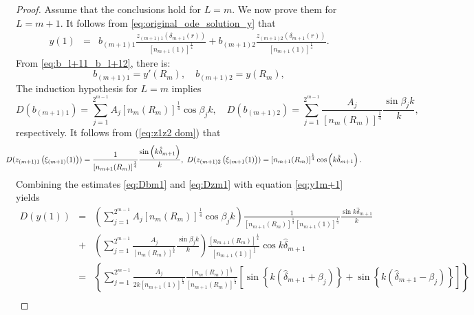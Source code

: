 \documentclass[11pt,reqno]{amsart}
\theoremstyle{definition}
\theoremstyle{remark}
\numberwithin{equation}{section}
\begin{document}
\begin{proof}
Assume that the conclusions hold for $L=m$. We now prove them for $L=m+1$.
It follows from \eqref{eq:original_ode_solution_y} that
\begin{eqnarray}\label{eq:y1m+1}
		y(1)&=&b_{(m+1)1}\frac{z_{(m+1)1}\left(\delta_{m+1}(r)\right)}{\left[n_{m+1}(1)\right]^{\frac{1}{4}}}+b_{(m+1)2}\frac{z_{(m+1)2}(\delta_{m+1}(r))}{\left[n_{m+1}(1)\right]^{\frac{1}{4}}}.
\end{eqnarray}
From \eqref{eq:b_l+11_b_l+12}, there is:
\begin{equation*}
	b_{(m+1)1}=y'(R_m), \quad b_{(m+1)2}=y(R_m), %
\end{equation*}
The induction hypothesis for $L=m$ implies
\begin{equation}\label{eq:Dbm1}
	D(b_{(m+1)1})=\sum_{j=1}^{2^{m-1}}A_j\left[n_m(R_m)\right]^{\frac{1}{4}}\cos{\beta_j k},\quad
	D(b_{(m+1)2})=\sum_{j=1}^{2^{m-1}}\frac{A_j}{\left[n_m(R_m)\right]^{\frac{1}{4}}}\frac{\sin{\beta_j k} }{k},
\end{equation}
respectively. It follows from (\ref{eq:z1z2 dom}) that
\begin{equation}\label{eq:Dzm1}
\hspace{-5mm}	D(z_{(m+1)1}\left(\xi_{(m+1)}(1)\right))=\frac{1}{\left[n_{m+1}(R_{m})\right]^{\frac{1}{4}}}\frac{\sin\left(k\hat{\delta}_{m+1}\right)}{k},~
	D(z_{(m+1)2}\left(\xi_{(m+1}(1)\right))=\left[n_{m+1}(R_{m})\right]^{\frac{1}{4}}\cos\left(k\hat{\delta}_{m+1}\right).
\end{equation}
Combining the estimates \eqref{eq:Dbm1} and \eqref{eq:Dzm1} with equation \eqref{eq:y1m+1} yields
\begin{eqnarray*}
D(y(1))&=&\left( \sum_{j=1}^{2^{m-1}}A_j\left[n_m(R_m)\right]^{\frac{1}{4}}\cos{\beta_j k} \right)\frac{1}{\left[n_{m+1}\left(R_m\right)\right]^{\frac{1}{4}}\left[n_{m+1}(1)\right]^{\frac{1}{4}}}\frac{\sin{k\hat{\delta}}_{m+1}}{k}\\
		&+&\left( \sum_{j=1}^{2^{m-1}}\frac{A_j}{\left[n_m(R_m)\right]^{\frac{1}{4}}}\frac{\sin{\beta_j k} }{k} \right)\frac{\left[n_{m+1}\left(R_m\right)\right]^{\frac{1}{4}}}{\left[n_{m+1}(1)\right]^{\frac{1}{4}}}\cos{k\hat{\delta}_{m+1}}\\
		&=&\left\{\sum_{j=1}^{2^{m-1}}\frac{A_j}{2k\left[n_{m+1}(1)\right]^{\frac{1}{4}}}\frac{\left[n_m\left(R_m\right)\right]^{\frac{1}{4}}}{\left[n_{m+1}\left(R_m\right)\right]^\frac{1}{4}}\left[\sin\left\{k\left(\hat{\delta}_{m+1}+\beta_j\right)\right\}+\sin\left\{k\left(\hat{\delta}_{m+1}-\beta_j\right)\right\}\right]\right\}\\

\end{eqnarray*}
\end{proof}
\end{document}
